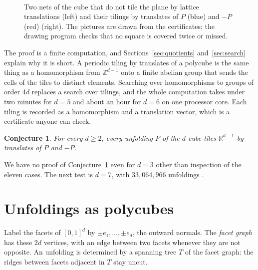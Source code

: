 \documentclass[11pt]{amsart}
\newtheorem{conjecture}[theorem]{Conjecture}
\theoremstyle{definition}
\theoremstyle{remark}
\newcommand{\Z}{\mathbb{Z}}
\newcommand{\R}{\mathbb{R}}
\begin{document}
\begin{figure}[ht]
\centering
\begin{minipage}[c]{0.22\textwidth}\centering\end{minipage}%
\begin{minipage}[c]{0.62\textwidth}\centering\end{minipage}\\[10pt]
\begin{minipage}[c]{0.22\textwidth}\centering\end{minipage}%
\begin{minipage}[c]{0.62\textwidth}\centering\end{minipage}
\caption{Two nets of the cube that do not tile the plane by lattice translations (left) and their tilings by translates of $P$ (blue) and $-P$ (red) (right). The pictures are drawn from the certificates; the drawing program checks that no square is covered twice or missed.}
\label{fig:cube}
\end{figure}


The proof is a finite computation, and Sections~\ref{sec:quotients} and~\ref{sec:search} explain why it is short. A periodic tiling by translates of a polycube is the same thing as a homomorphism from $\Z^{d-1}$ onto a finite abelian group that sends the cells of the tiles to distinct elements. Searching over homomorphisms to groups of order $4d$ replaces a search over tilings, and the whole computation takes under two minutes for $d=5$ and about an hour for $d=6$ on one processor core. Each tiling is recorded as a homomorphism and a translation vector, which is a certificate anyone can check.

\begin{conjecture}\label{conj}
For every $d\ge2$, every unfolding $P$ of the $d$-cube tiles $\R^{d-1}$ by translates of $P$ and $-P$.
\end{conjecture}

We have no proof of Conjecture~\ref{conj} even for $d=3$ other than inspection of the eleven cases. The next test is $d=7$, with $33{,}064{,}966$ unfoldings \cite{OEIS91159}.

\section{Unfoldings as polycubes}\label{sec:unfold}

Label the facets of $[0,1]^d$ by $\pm e_1,\dots,\pm e_d$, the outward normals. The \emph{facet graph} has these $2d$ vertices, with an edge between two facets whenever they are not opposite. An unfolding is determined by a spanning tree $T$ of the facet graph: the ridges between facets adjacent in $T$ stay uncut.
\end{document}
